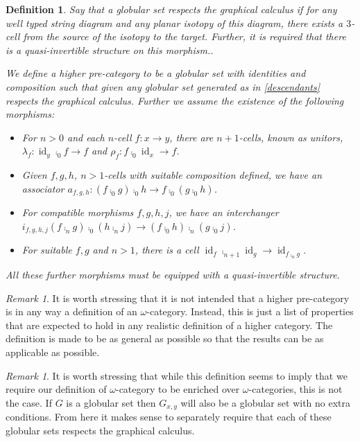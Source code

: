 \documentclass[draft]{article}
\newtheorem{definition}[theorem]{Definition} \theoremstyle{remark}
\newtheorem{remark}[theorem]{Remark} \newtheorem*{claim}{Claim}
\DeclareMathOperator{\id}{id}
\begin{document}
\begin{definition}\label{def:higher-cat}
  Say that a globular set \emph{respects the graphical calculus} if
  for any well typed string diagram and any planar isotopy of this
  diagram, there exists a \(3\)-cell from the source of the isotopy to
  the target. Further, it is required that there is a quasi-invertible
  structure on this morphism..

  We define a \emph{higher pre-category} to be a globular set with
  identities and composition such that given any globular set
  generated as in \cref{descendants} respects the graphical calculus.
  Further we assume the existence of the following morphisms:
  \begin{itemize}
  \item For \(n>0\) and each \(n\)-cell \(f: x \to y\), there are
    \(n+1\)-cells, known as unitors, \(\lambda_f: \id_y \comp_0 f \to
    f\) and \(\rho_f: f \comp_0 \id_x \to f\).
  \item Given \(f,g,h\), \(n>1\)-cells with suitable composition
    defined, we have an associator \(a_{f,g,h} : (f \comp_0 g) \comp_0
    h \to f \comp_0 (g \comp_0 h)\).
  \item For compatible morphisms \(f,g,h,j\), we have an interchanger
    \(i_{f,g,h,j}(f \comp_n g) \comp_0 (h \comp_n j) \to (f \comp_0 h)
    \comp_n (g \comp_0 j)\).
  \item For suitable \(f,g\) and \(n > 1\), there is a cell \(\id_f
    \comp_{n+1} \id_g \to \id_{f \comp_n g}\).
  \end{itemize}
  All these further morphisms must be equipped with a quasi-invertible
  structure.
\end{definition}

\begin{remark}
  It is worth stressing that it is not intended that a higher
  pre-category is in any way a definition of an \(\omega\)-category.
  Instead, this is just a list of properties that are expected to hold
  in any realistic definition of a higher category. The definition is
  made to be as general as possible so that the results can be as
  applicable as possible.
\end{remark}

\begin{remark}
  It is worth stressing that while this definition seems to imply that
  we require our definition of \(\omega\)-category to be enriched over
  \(\omega\)-categories, this is not the case. If \(G\) is a globular
  set then \(G_{x,y}\) will also be a globular set with no extra
  conditions. From here it makes sense to separately require that each
  of these globular sets respects the graphical calculus.
\end{remark}
\end{document}

